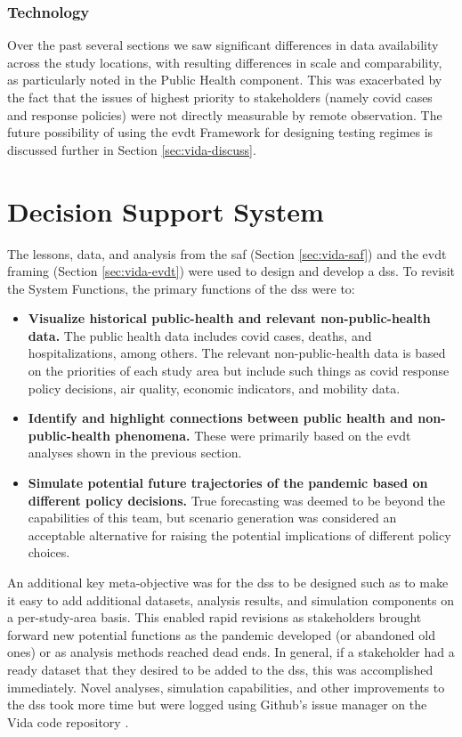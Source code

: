 \subsubsection{Technology}

Over the past several sections we saw significant differences in data availability across the study locations, with resulting differences in scale and comparability, as particularly noted in the Public Health component. This was exacerbated by the fact that the issues of highest priority to stakeholders (namely \ac{covid} cases and response policies) were not directly measurable by remote observation. The future possibility of using the \ac{evdt} Framework for designing testing regimes is discussed further in Section \ref{sec:vida-discuss}.


\section{Decision Support System} \label{sec:vida-dss}

The lessons, data, and analysis from the \ac{saf} (Section \ref{sec:vida-saf}) and the \ac{evdt} framing (Section \ref{sec:vida-evdt}) were used to design and develop a \acf{dss}. To revisit the System Functions, the primary functions of the \ac{dss} were to:

\begin{itemize}[itemsep=0pt,parsep=0pt]
	\item{\textbf{Visualize historical public-health and relevant non-public-health data.} The public health data includes \ac{covid} cases, deaths, and hospitalizations, among others. The relevant non-public-health data is based on the priorities of each study area but include such things as \ac{covid} response policy decisions, air quality, economic indicators, and mobility data.}
	\item{\textbf{Identify and highlight connections between public health and non-public-health phenomena.} These were primarily based on the \ac{evdt} analyses shown in the previous section.}
	\item{\textbf{Simulate potential future trajectories of the pandemic based on different policy decisions.} True forecasting was deemed to be beyond the capabilities of this team, but scenario generation was considered an acceptable alternative for raising the potential implications of different policy choices.} 
\end{itemize}

An additional key meta-objective was for the \ac{dss} to be designed such as to make it easy to add additional datasets, analysis results, and simulation components on a per-study-area basis. This enabled rapid revisions as stakeholders brought forward new potential functions as the pandemic developed (or abandoned old ones) or as analysis methods reached dead ends. In general, if a stakeholder had a ready dataset that they desired to be added to the \ac{dss}, this was accomplished immediately. Novel analyses, simulation capabilities, and other improvements to the \ac{dss} took more time but were logged using Github's issue manager on the Vida code repository \cite{reidMITVidaRepository2021}.

